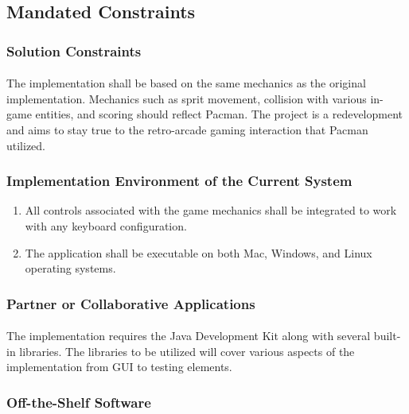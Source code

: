 \documentclass[12pt, titlepage]{article}
\begin{document}
\subsection{Mandated Constraints}

\subsubsection{Solution Constraints}
\paragraph{}
The implementation shall be based on the same mechanics as the original implementation. Mechanics such as sprit movement, collision with various in-game entities, and scoring should reflect Pacman. The project is a redevelopment and aims to stay true to the retro-arcade gaming interaction that Pacman utilized. 

\subsubsection{Implementation Environment of the Current System}
\begin{enumerate}[i]
\item All controls associated with the game mechanics shall be integrated to work with any keyboard configuration.
\item The application shall be executable on both Mac, Windows, and Linux operating systems.
\end{enumerate} 

\subsubsection{Partner or Collaborative Applications}
\paragraph{}
The implementation requires the Java Development Kit along with several built-in libraries. The libraries to be utilized will cover various aspects of the implementation from GUI to testing elements.

\subsubsection{Off-the-Shelf Software}
\end{document}
